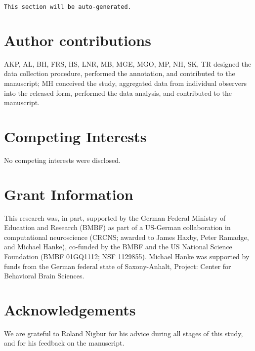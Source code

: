 \documentclass[10pt,a4paper,twocolumn]{article}
\begin{document}
\texttt{This section will be auto-generated.}


\section*{Author contributions}
AKP, AL, BH, FRS, HS, LNR, MB, MGE, MGO, MP, NH, SK, TR designed the data
collection procedure, performed the annotation, and contributed to the
manuscript; MH conceived the study, aggregated data from individual observers
into the released form, performed the data analysis, and contributed to the
manuscript.

\section*{Competing Interests}
No competing interests were disclosed.

\section*{Grant Information}

This research was, in part, supported by the German Federal Ministry of
Education and Research (BMBF) as part of a US-German collaboration in
computational neuroscience (CRCNS; awarded to James Haxby, Peter Ramadge, and
Michael Hanke), co-funded by the BMBF and the US National Science Foundation
(BMBF 01GQ1112; NSF 1129855). Michael Hanke was supported by funds from the
German federal state of Saxony-Anhalt, Project: Center for Behavioral Brain
Sciences.

\section*{Acknowledgements}

We are grateful to Roland Nigbur for his advice during all stages of this
study, and for his feedback on the manuscript.

{\small
}
\end{document}
